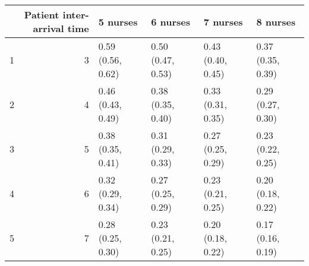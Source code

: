 \begin{table}[ht]
\centering
\begin{tabular}{rrllll}
  \hline
 & Patient inter-arrival time & 5 nurses & 6 nurses & 7 nurses & 8 nurses \\ 
  \hline
1 &   3 & 0.59 (0.56, 0.62) & 0.50 (0.47, 0.53) & 0.43 (0.40, 0.45) & 0.37 (0.35, 0.39) \\ 
  2 &   4 & 0.46 (0.43, 0.49) & 0.38 (0.35, 0.40) & 0.33 (0.31, 0.35) & 0.29 (0.27, 0.30) \\ 
  3 &   5 & 0.38 (0.35, 0.41) & 0.31 (0.29, 0.33) & 0.27 (0.25, 0.29) & 0.23 (0.22, 0.25) \\ 
  4 &   6 & 0.32 (0.29, 0.34) & 0.27 (0.25, 0.29) & 0.23 (0.21, 0.25) & 0.20 (0.18, 0.22) \\ 
  5 &   7 & 0.28 (0.25, 0.30) & 0.23 (0.21, 0.25) & 0.20 (0.18, 0.22) & 0.17 (0.16, 0.19) \\ 
   \hline
\end{tabular}
\end{table}
